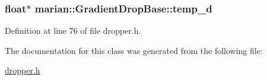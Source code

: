 \subsubsection[{\texorpdfstring{temp\+\_\+d}{temp_d}}]{\setlength{\rightskip}{0pt plus 5cm}float$\ast$ marian\+::\+Gradient\+Drop\+Base\+::temp\+\_\+d\hspace{0.3cm}{\ttfamily [private]}}\hypertarget{classmarian_1_1GradientDropBase_a90fc3332c4dbfbb0e59e421db411be27}{}\label{classmarian_1_1GradientDropBase_a90fc3332c4dbfbb0e59e421db411be27}


Definition at line 76 of file dropper.\+h.



The documentation for this class was generated from the following file\+:\begin{DoxyCompactItemize}
\item 
\hyperlink{dropper_8h}{dropper.\+h}\end{DoxyCompactItemize}
